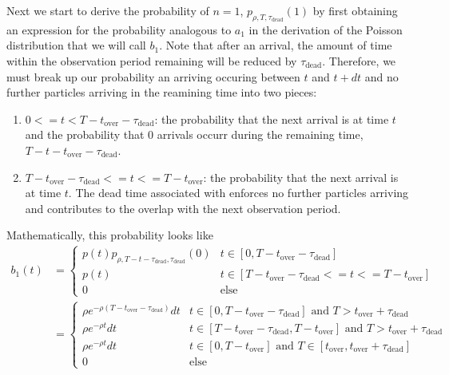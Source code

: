 \documentclass{article}
\newcommand{\dead}{\tau_{\text{dead}}}
\newcommand{\overlap}{t_{\text{over}}}
\begin{document}
Next we start to derive the probability of $n = 1$, $p_{\rho, T, \dead}(1)$
by first obtaining an expression for the probability analogous to 
$a_1$ in the derivation of the Poisson distribution that we will call $b_1$.  Note
that after an arrival, the amount of time within the 
observation period remaining will be reduced by $\dead$.  Therefore, we
must break up our probability
an arriving occuring between $t$ and $t + dt$ and no further particles
arriving in the reamining time into two pieces:
\begin{enumerate}
	\item{$0 <= t < T - \overlap - \dead$: the probability that the next arrival
		is at time $t$ and the probability that $0$ arrivals occurr
		during the remaining time, $T - t - \overlap - \dead$.}
	\item{$T - \overlap - \dead <= t <= T - \overlap$: the probability that the next arrival
    is at time $t$.  The dead time associated with enforces
		no further particles arriving and contributes to 
		the overlap with the next observation period.}
\end{enumerate}
Mathematically, this probability looks like
\begin{align}
	b_1(t)
	  &= \begin{cases}
			   p(t) p_{\rho, T - t - \dead, \dead}(0) & t \in [0, T - \overlap - \dead]\\
				 p(t)                             & t \in [T - \overlap - \dead <= t <= T - \overlap]\\
				 0                                & \text{else}
			 \end{cases}\nonumber\\
		&= \begin{cases}
			\rho e^{-\rho (T - \overlap - \dead)}dt & t \in [0, T - \overlap - \dead] \text{ and } T > \overlap + \dead\\
				 \rho e^{-\rho t}dt                      & t \in [T - \overlap - \dead, T - \overlap] \text{ and } T > \overlap + \dead \\
				 \rho e^{-\rho t}dt                      & t \in [0, T - \overlap] \text{ and } T \in [\overlap, \overlap + \dead] \\
				 0                                       & \text{else}
		\end{cases}\label{eq:b_1}
\end{align}
\end{document}

